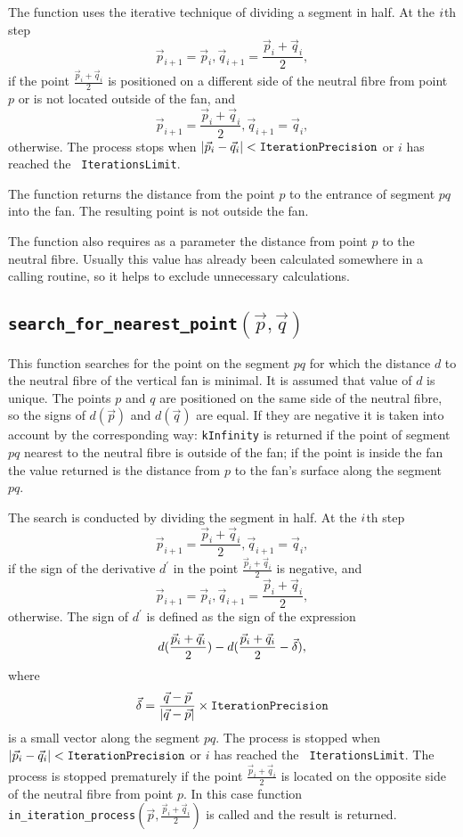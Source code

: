 \documentclass{article}
\begin{document}
The function uses the iterative technique of dividing a segment in half. At the
$i\/$th step
\[\vec{p}_{i+1} = \vec{p}_i,  \vec{q}_{i+1} = \frac{\vec{p}_i+\vec{q}_i}{2},\]
if the point $\frac{\vec{p}_i+\vec{q}_i}{2}$ is positioned on a different
side of the neutral fibre from point $p$ or is not located outside of the 
fan, and
\[\vec{p}_{i+1} = \frac{\vec{p}_i+\vec{q}_i}{2}, \vec{q}_{i+1} = \vec{q}_i,\]
otherwise. The process stops when
$|\vec{p}_i-\vec{q}_i|<{\tt IterationPrecision\/}\/$ or $i$ has reached the {\tt
IterationsLimit\/}.

The function returns the distance from the point $p$ to the entrance
of segment $pq$ into the fan. The resulting point is not outside the fan.

The function also requires as a parameter the distance from point $p$ to the
neutral fibre. Usually this value has already been calculated somewhere in a
calling routine, so it helps to exclude unnecessary calculations.

\subsection{\tt search\_for\_nearest\_point$(\vec{p}, \vec{q})$}
This function searches for the point on the segment $pq$ for which the
 distance $d$ to the neutral fibre of the vertical fan is minimal. It
 is assumed that value of $d$ is unique.  The points $p$ and $q$ are
 positioned on the same side of the neutral fibre, so the signs of
 $d(\vec{p})$ and $d(\vec{q})$ are equal. If they are negative it is
 taken into account by the corresponding way: {\tt kInfinity} is returned
 if the point of segment $pq$ nearest to the neutral fibre is outside
 of the fan; if the point is inside the fan the value returned is the
 distance from $p$ to the fan's surface along the segment $pq$.

The search is conducted by dividing the segment in half.
At the $i\/$th step 
\[ \vec{p}_{i+1} = \frac{\vec{p}_i+\vec{q}_i}{2}, \vec{q}_{i+1} = \vec{q}_i,\]
if the sign of the derivative $d^{\prime}$ in the point
$\frac{\vec{p}_i+\vec{q}_i}{2}$ is negative, and \[\vec{p}_{i+1} = \vec{p}_i,
\vec{q}_{i+1} = \frac{\vec{p}_i+\vec{q}_i}{2},\] 
otherwise. 
The sign of $d^{\prime}$ is defined as the sign of the expression
\[d(\frac{\vec{p}_i+\vec{q}_i}{2}) -
d(\frac{\vec{p}_i+\vec{q}_i}{2}-\vec{\delta})\/,\] where \[\vec{\delta} =
\frac{\vec{q}-\vec{p}}{|\vec{q}-\vec{p}|}\times{\tt
  IterationPrecision}\] is a
small vector along the segment $pq$. 
The process is stopped when
$|\vec{p}_i-\vec{q}_i|<{\tt IterationPrecision}\/$ or $i$ has reached the {\tt
IterationsLimit}. The process is stopped prematurely if 
the point $\frac{\vec{p}_i+\vec{q}_i}{2}$ is located on the opposite side
of the neutral fibre from point $p$. In this case function \\
{\tt in\_iteration\_process$(\vec{p}, \frac{\vec{p}_i+\vec{q}_i}{2})$} is called
and the result is returned. 
\end{document}
